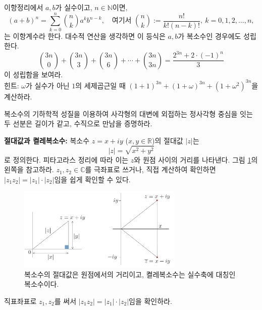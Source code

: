 \begin{salt_exercise} \label{ex-1-12}
이항정리에서
$a,b$가 실수이고, $n\in\mathbb N$이면,
$$
(a+b)^n = \sum_{k=0}^n {n \choose k}a^kb^{n-k},
\quad
\text{여기서 }
{n \choose k} := \frac{n!}{k!(n-k)!}, \
k=0,1,2,\ldots, n,
$$
는 이항계수라 한다.
대수적 연산을 생각하면 이 등식은 $a,b$가 복소수인 경우에도 성립한다.
$$
{3n \choose 0} + {3n \choose 3} + {3n \choose 6} + \cdots
+ {3n \choose 3n} = \dfrac{2^{3n} + 2\cdot(-1)^n}3
$$
이 성립함을 보여라. \\[1ex]
힌트: $\omega$가 실수가 아닌 $1$의 세제곱근일 때
$(1+1)^{3n} + (1+\omega)^{3n} + (1+\omega^2)^{3n}$을 계산하라.
\end{salt_exercise}

\begin{salt_exercise} \label{ex-1-13}
복소수의 기하학적 성질을 이용하여 
사각형의 대변에 외접하는 정사각형 중심을 잇는 두 선분은
길이가 같고, 수직으로 만남을 증명하라.
\end{salt_exercise}

{\bf 절대값과 켤레복소수: }
복소수 $z=x+iy$ ($x,y\in\mathbb R$)의 절대값 $|z|$는
$$
|z| = \sqrt{x^2+y^2}
$$
로 정의한다.
피타고라스 정리에 따라 이는 $z$와 원점 사이의 거리를 나타낸다.
그림 \ref{fig-1-9}의 왼쪽을 참고하라.
$z_1, z_2\in \mathbb C$를 극좌표로 쓰거나, 직접 계산하여 확인하면
$|z_1z_2| = |z_1|\cdot |z_2|$임을 쉽게 확인할 수 있다.

\begin{figure}[!h]
\begin{center}
\includegraphics[width=0.7\textwidth]{./SaltChapter/figs/fig-1-9}
\end{center}
\caption{복소수의 절대값은 원점에서의 거리이고, 켤레복소수는 실수축에 대칭인 복소수이다.}
\label{fig-1-9}
\end{figure}

\begin{salt_exercise} \label{ex-1-14}
직표좌표로 $z_1, z_2$를 써서 $|z_1z_2| = |z_1|\cdot |z_2|$임을 확인하라.
\end{salt_exercise}

